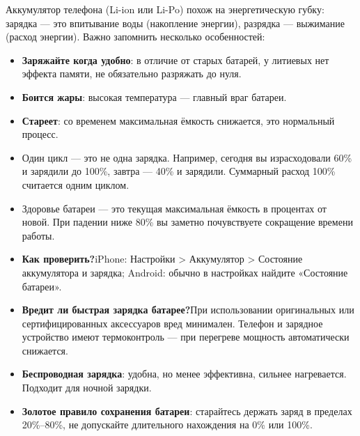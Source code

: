 


Аккумулятор телефона (Li-ion или Li-Po) похож на энергетическую губку: зарядка — это впитывание воды (накопление энергии), разрядка — выжимание (расход энергии). Важно запомнить несколько особенностей:

\begin{itemize}
  \item \textbf{Заряжайте когда удобно}: в отличие от старых батарей, у литиевых нет эффекта памяти, не обязательно разряжать до нуля.
  \item \textbf{Боится жары}: высокая температура — главный враг батареи.
  \item \textbf{Стареет}: со временем максимальная ёмкость снижается, это нормальный процесс.
\end{itemize}


\begin{itemize}
  \item Один цикл — это не одна зарядка. Например, сегодня вы израсходовали 60\% и зарядили до 100\%, завтра — 40\% и зарядили. Суммарный расход 100\% считается одним циклом.
  \item Здоровье батареи — это текущая максимальная ёмкость в процентах от новой. При падении ниже 80\% вы заметно почувствуете сокращение времени работы.
  \item \textbf{Как проверить?}iPhone: Настройки > Аккумулятор > Состояние аккумулятора и зарядка; Android: обычно в настройках найдите «Состояние батареи».
\end{itemize}


\begin{itemize}
  \item \textbf{Вредит ли быстрая зарядка батарее?}При использовании оригинальных или сертифицированных аксессуаров вред минимален. Телефон и зарядное устройство имеют термоконтроль — при перегреве мощность автоматически снижается.
  \item \textbf{Беспроводная зарядка}: удобна, но менее эффективна, сильнее нагревается. Подходит для ночной зарядки.
  \item \textbf{Золотое правило сохранения батареи}: старайтесь держать заряд в пределах 20\%–80\%, не допускайте длительного нахождения на 0\% или 100\%.
\end{itemize}

